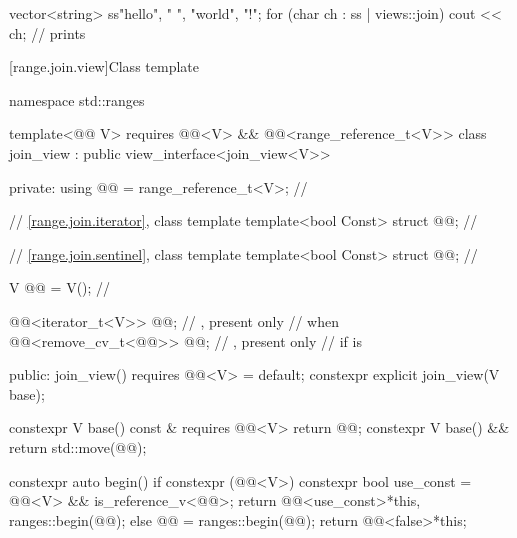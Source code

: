 \pnum
\begin{example}
\begin{codeblock}
vector<string> ss{"hello", " ", "world", "!"};
for (char ch : ss | views::join)
  cout << ch;                                   // prints 
\end{codeblock}
\end{example}

[range.join.view]{Class template }

%
%
%
%
\begin{codeblock}
namespace std::ranges {
  template<@@ V>
    requires @@<V> && @@<range_reference_t<V>>
  class join_view : public view_interface<join_view<V>> {
  private:
    using @@ = range_reference_t<V>;                  // \expos

    // \ref{range.join.iterator}, class template 
    template<bool Const>
      struct @@;                                      // \expos

    // \ref{range.join.sentinel}, class template 
    template<bool Const>
      struct @@;                                      // \expos

    V @@ = V();                                          // \expos

    @@<iterator_t<V>> @@;            // \expos, present only
                                                            // when 
    @@<remove_cv_t<@@>> @@;    // \expos, present only
                                                            // if  is 

  public:
    join_view() requires @@<V> = default;
    constexpr explicit join_view(V base);

    constexpr V base() const & requires @@<V> { return @@; }
    constexpr V base() && { return std::move(@@); }

    constexpr auto begin() {
      if constexpr (@@<V>) {
        constexpr bool use_const = @@<V> &&
                                   is_reference_v<@@>;
        return @@<use_const>{*this, ranges::begin(@@)};
      } else {
        @@ = ranges::begin(@@);
        return @@<false>{*this};
      }
    }

}}
\end{codeblock}
